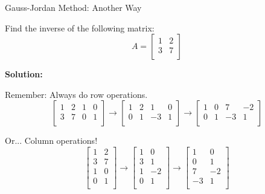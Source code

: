 \documentclass{beamer}
\begin{document}
\begin{frame}{Gauss-Jordan Method: Another Way}
\begin{example}
    Find the inverse of the following matrix:
    \begin{equation*}
        A=\left[ \begin{matrix}
            1&		2\\
            3&		7\\
        \end{matrix} \right]
    \end{equation*}
\end{example}

\textbf{Solution:}

Remember: Always do row operations.
\begin{equation*}
    \left[ \begin{matrix}
        1&		2&		1&		0\\
        3&		7&		0&		1\\
    \end{matrix} \right] \rightarrow \left[ \begin{matrix}
        1&		2&		1&		0\\
        0&		1&		-3&		1\\
    \end{matrix} \right] \rightarrow \left[ \begin{matrix}
        1&		0&		7&		-2\\
        0&		1&		-3&		1\\
    \end{matrix} \right]
\end{equation*}

Or... Column operations!
\begin{equation*}
    \left[ \begin{matrix}
        1&		2\\
        3&		7\\
        1&		0\\
        0&		1\\
    \end{matrix} \right] \rightarrow \left[ \begin{matrix}
        1&		0\\
        3&		1\\
        1&		-2\\
        0&		1\\
    \end{matrix} \right] \rightarrow \left[ \begin{matrix}
        1&		0\\
        0&		1\\
        7&		-2\\
        -3&		1\\
    \end{matrix} \right]
\end{equation*}
\end{frame}
\end{document}
